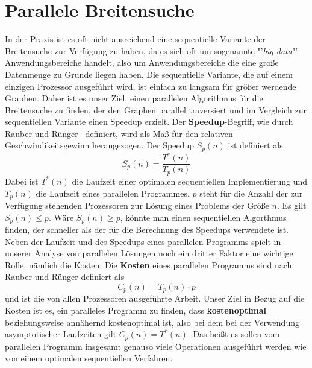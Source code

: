 \documentclass[11pt,a4paper]{article}
\begin{document}
\section{Parallele Breitensuche}
\label{parallel}
In der Praxis ist es oft nicht ausreichend eine sequentielle Variante der Breitensuche zur Verfügung zu haben, da es sich oft um sogenannte "'\textit{big data}"' Anwendungsbereiche handelt, also um Anwendungsbereiche die eine große Datenmenge zu Grunde liegen haben. Die sequentielle Variante, die auf einem einzigen Prozessor ausgeführt wird, ist einfach zu langsam für größer werdende Graphen. Daher ist es unser Ziel, einen parallelen Algorithmus für die Breitensuche zu finden, der den Graphen parallel traversiert und im Vergleich zur sequentiellen Variante einen Speedup erzielt. Der \textbf{Speedup}-Begriff, wie durch Rauber und Rünger~\cite{rauber} definiert, wird als Maß für den relativen Geschwindikeitsgewinn herangezogen. Der Speedup \(S_{p}(n)\) ist definiert als
\begin{equation}
	S_{p}(n) = \frac{T^{*}(n)}{T_{p}(n)}
\end{equation}
Dabei ist \(T^{*}(n)\) die Laufzeit einer optimalen sequentiellen Implementierung und \(T_{p}(n) \) die Laufzeit eines parallelen Programmes. \(p\) steht für die Anzahl der zur Verfügung stehenden Prozessoren zur Lösung eines Problems der Größe \(n\). Es gilt \(S_{p}(n) \leq p\). Wäre \(S_{p}(n) \geq p\), könnte man einen sequentiellen Algorthmus finden, der schneller als der für die Berechnung des Speedups verwendete ist.\\
Neben der Laufzeit und des Speedups eines parallelen Programms spielt in unserer Analyse von parallelen Lösungen noch ein dritter Faktor eine wichtige Rolle, nämlich die Kosten. Die \textbf{Kosten} eines parallelen Programms sind nach Rauber und Rünger \cite{rauber} definiert als
\begin{equation}
	C_{p}(n) = T_{p}(n) \cdot p
 \end{equation}
und ist die von allen Prozessoren ausgeführte Arbeit. Unser Ziel in Bezug auf die Kosten ist es, ein paralleles Programm zu finden, dass \textbf{kostenoptimal} beziehungsweise annähernd kostenoptimal ist, also bei dem bei der Verwendung asymptotischer Laufzeiten gilt \(C_{p}(n) = T^{*}(n)\). Das heißt es sollen vom parallelen Programm insgesamt genauso viele Operationen ausgeführt werden wie von einem optimalen sequentiellen Verfahren.
\end{document}
